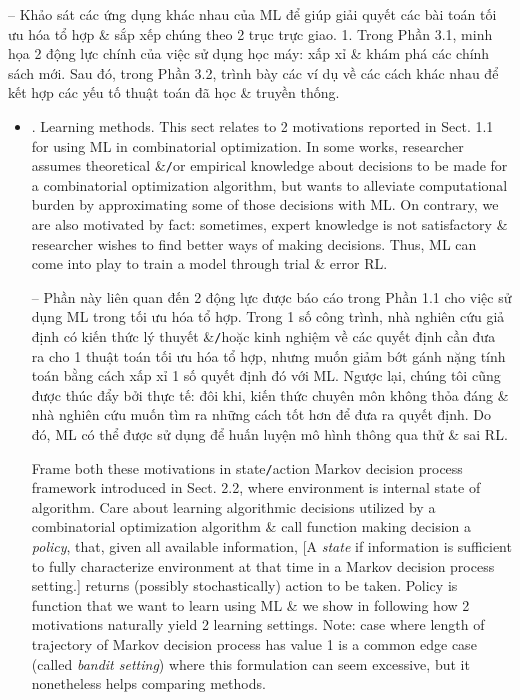 \documentclass{article}
\begin{document}
\begin{itemize}
    -- Khảo sát các ứng dụng khác nhau của ML để giúp giải quyết các bài toán tối ưu hóa tổ hợp \& sắp xếp chúng theo 2 trục trực giao. 1. Trong Phần 3.1, minh họa 2 động lực chính của việc sử dụng học máy: xấp xỉ \& khám phá các chính sách mới. Sau đó, trong Phần 3.2, trình bày các ví dụ về các cách khác nhau để kết hợp các yếu tố thuật toán đã học \& truyền thống.
    \begin{itemize}
        \item {. Learning methods.} This sect relates to 2 motivations reported in Sect. 1.1 for using ML in combinatorial optimization. In some works, researcher assumes theoretical \&{\tt/}or empirical knowledge about decisions to be made for a combinatorial optimization algorithm, but wants to alleviate computational burden by approximating some of those decisions with ML. On contrary, we are also motivated by fact: sometimes, expert knowledge is not satisfactory \& researcher wishes to find better ways of making decisions. Thus, ML can come into play to train a model through trial \& error RL.

        -- Phần này liên quan đến 2 động lực được báo cáo trong Phần 1.1 cho việc sử dụng ML trong tối ưu hóa tổ hợp. Trong 1 số công trình, nhà nghiên cứu giả định có kiến thức lý thuyết \&{\tt/}hoặc kinh nghiệm về các quyết định cần đưa ra cho 1 thuật toán tối ưu hóa tổ hợp, nhưng muốn giảm bớt gánh nặng tính toán bằng cách xấp xỉ 1 số quyết định đó với ML. Ngược lại, chúng tôi cũng được thúc đẩy bởi thực tế: đôi khi, kiến thức chuyên môn không thỏa đáng \& nhà nghiên cứu muốn tìm ra những cách tốt hơn để đưa ra quyết định. Do đó, ML có thể được sử dụng để huấn luyện mô hình thông qua thử \& sai RL.

        Frame both these motivations in state{\tt/}action Markov decision process framework introduced in Sect. 2.2, where environment is internal state of algorithm. Care about learning algorithmic decisions utilized by a combinatorial optimization algorithm \& call function making decision a {\it policy}, that, given all available information, [A {\it state} if information is sufficient to fully characterize environment at that time in a Markov decision process setting.] returns (possibly stochastically) action to be taken. Policy is function that we want to learn using ML \& we show in following how 2 motivations naturally yield 2 learning settings. Note: case where length of trajectory of Markov decision process has value 1 is a common edge case (called {\it bandit setting}) where this formulation can seem excessive, but it nonetheless helps comparing methods.


\end{itemize}
\end{itemize}
\end{document}
